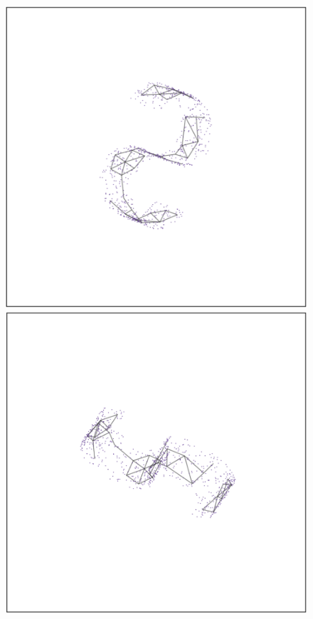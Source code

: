 \documentclass[
  12pt]{article}
\begin{document}
\begin{figure}[H]

\begin{minipage}{0.33\linewidth}
\includegraphics{figures/scurve/sc_bad_1.png}\end{minipage}%
%
\begin{minipage}{0.33\linewidth}
\includegraphics{figures/scurve/sc_bad_2.png}\end{minipage}%

\end{figure}
\end{document}
